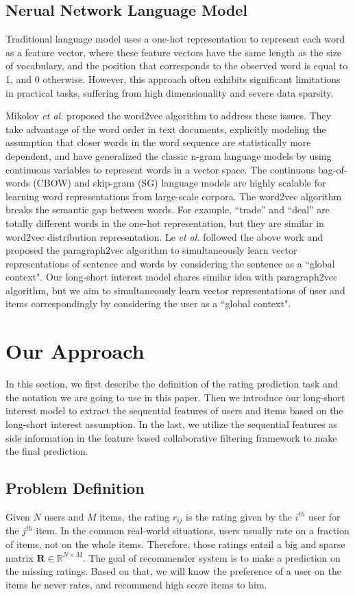 \documentclass{sig-alternate-05-2015}
\begin{document}
\subsection{Nerual Network Language Model}
Traditional language model uses a one-hot representation to represent each word
as a feature vector, where these feature vectors have the same length as the size
of vocabulary, and the position that corresponds to the observed word is equal to 1,
and 0 otherwise. However, this approach often exhibits significant limitations
in practical tasks, suffering from high dimensionality and severe data sparsity.

Mikolov \textit{et al.} \cite{mikolov2013efficient, mikolov2013distributed} proposed
the word2vec algorithm to address these issues. They take advantage of the word order
in text documents, explicitly modeling the assumption that closer words in the word
sequence are statistically more dependent, and have generalized the classic n-gram
language models by using continuous variables to represent words in a vector space.
The continuous bag-of-words (CBOW) and skip-gram (SG) language models are highly
scalable for learning word representations from large-scale corpora.
The word2vec algorithm breaks the semantic gap between words.
For example, ``trade'' and ``deal'' are totally different words in the one-hot representation,
but they are similar in word2vec distribution representation.
Le \textit{et al.} \cite{le2014distributed} followed the above work and proposed
the paragraph2vec algorithm to simultaneously learn vector representations of sentence
and words by considering the sentence as a ``global context".
Our long-short interest model shares similar idea with paragraph2vec algorithm,
but we aim to simultaneously learn vector representations of user and items
correspondingly by considering the user as a ``global context".

\section{Our Approach}
In this section,
we first describe the definition of the rating prediction task and
the notation we are going to use in this paper.
Then we introduce our long-short interest model to extract the sequential features
of users and items based on the long-short interest assumption.
In the last, we utilize the sequential features as side information
in the feature based collaborative filtering framework to make the final prediction.

\subsection{Problem Definition}
Given $N$ users and $M$ items, the rating $r_{ij}$ is the rating given by
the $i^{th}$ user for the $j^{th}$ item.
In the common real-world situations,
users usually rate on a fraction of items, not on the whole items.
Therefore,
those ratings entail a big and sparse matrix $\mathbf{R} \in \mathbb{R}^{N \times M}$.
The goal of recommender system is to make a prediction on the missing ratings.
Based on that, we will know the preference of a user on the items he never rates,
and recommend high score items to him.
\end{document}
